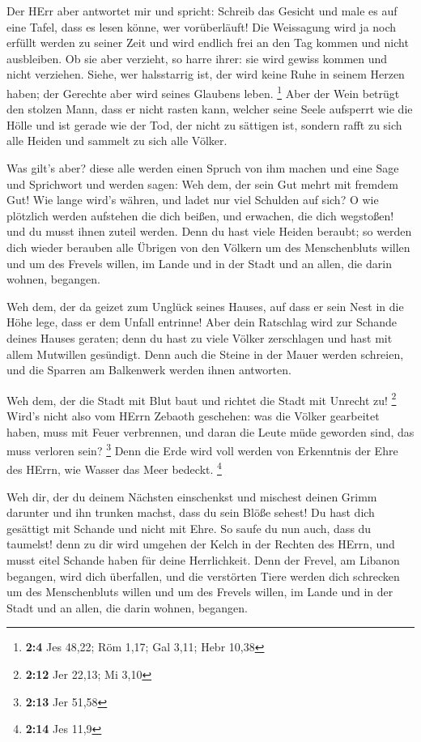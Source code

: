  Der HErr aber antwortet mir und spricht: Schreib das
Gesicht und male es auf eine Tafel, dass es lesen könne, wer
vorüberläuft!  Die Weissagung wird ja noch erfüllt werden zu
seiner Zeit und wird endlich frei an den Tag kommen und nicht
ausbleiben. Ob sie aber verzieht, so harre ihrer: sie wird gewiss kommen
und nicht verziehen.  Siehe, wer halsstarrig ist, der wird
keine Ruhe in seinem Herzen haben; der Gerechte aber wird seines
Glaubens leben. \footnote{\textbf{2:4} Jes 48,22; Röm 1,17; Gal 3,11;
  Hebr 10,38}  Aber der Wein betrügt den stolzen Mann, dass
er nicht rasten kann, welcher seine Seele aufsperrt wie die Hölle und
ist gerade wie der Tod, der nicht zu sättigen ist, sondern rafft zu sich
alle Heiden und sammelt zu sich alle Völker.

 Was gilt's aber? diese alle werden einen Spruch von ihm
machen und eine Sage und Sprichwort und werden sagen: Weh dem, der sein
Gut mehrt mit fremdem Gut! Wie lange wird's währen, und ladet nur viel
Schulden auf sich?  O wie plötzlich werden aufstehen die
dich beißen, und erwachen, die dich wegstoßen! und du musst ihnen zuteil
werden.  Denn du hast viele Heiden beraubt; so werden dich
wieder berauben alle Übrigen von den Völkern um des Menschenbluts willen
und um des Frevels willen, im Lande und in der Stadt und an allen, die
darin wohnen, begangen.

 Weh dem, der da geizet zum Unglück seines Hauses, auf dass
er sein Nest in die Höhe lege, dass er dem Unfall entrinne!
 Aber dein Ratschlag wird zur Schande deines Hauses
geraten; denn du hast zu viele Völker zerschlagen und hast mit allem
Mutwillen gesündigt.  Denn auch die Steine in der Mauer
werden schreien, und die Sparren am Balkenwerk werden ihnen antworten.

 Weh dem, der die Stadt mit Blut baut und richtet die Stadt
mit Unrecht zu! \footnote{\textbf{2:12} Jer 22,13; Mi 3,10}
 Wird's nicht also vom HErrn Zebaoth geschehen: was die
Völker gearbeitet haben, muss mit Feuer verbrennen, und daran die Leute
müde geworden sind, das muss verloren sein? \footnote{\textbf{2:13} Jer
  51,58}  Denn die Erde wird voll werden von Erkenntnis der
Ehre des HErrn, wie Wasser das Meer bedeckt. \footnote{\textbf{2:14} Jes
  11,9}

 Weh dir, der du deinem Nächsten einschenkst und mischest
deinen Grimm darunter und ihn trunken machst, dass du sein Blöße sehest!
 Du hast dich gesättigt mit Schande und nicht mit Ehre. So
saufe du nun auch, dass du taumelst! denn zu dir wird umgehen der Kelch
in der Rechten des HErrn, und musst eitel Schande haben für deine
Herrlichkeit.  Denn der Frevel, am Libanon begangen, wird
dich überfallen, und die verstörten Tiere werden dich schrecken um des
Menschenbluts willen und um des Frevels willen, im Lande und in der
Stadt und an allen, die darin wohnen, begangen.

